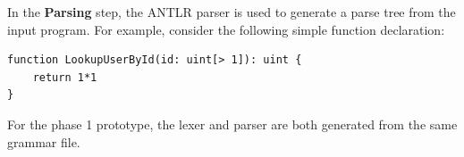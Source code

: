 \documentclass[a4paper]{article}
\begin{document}
    In the \textbf{Parsing} step, the ANTLR parser is used to generate a parse tree from the input program. For example, consider the following simple function declaration:
    
    \begin{verbatim}
function LookupUserById(id: uint[> 1]): uint {
    return 1*1
}
    \end{verbatim}
    
    
    For the phase 1 prototype, the lexer and parser are both generated from the same grammar file.




\end{document}
